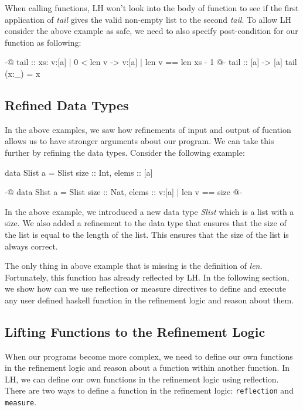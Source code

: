 \documentclass[]{rptuseminar}
\begin{document}
When calling functions, LH won't look into the body of function to see if the first application of \textit{tail} gives the valid non-empty list to the second \textit{tail}.
To allow LH consider the above example as safe, we need to also specify post-condition for our function as following:

\begin{haskell}
 {-@ tail :: xs: {v:[a] | 0 < len v} -> {v:[a] | len v == len xs - 1} @-}
 tail :: [a] -> [a]
 tail (x:_) = x
\end{haskell}
\subsection{Refined Data Types}
In the above examples, we saw how refinements of input and output of fucntion allows us to have stronger arguments about our program. 
We can take this further by refining the data types. Consider the following example:

\begin{haskell}
  data Slist a = Slist { size :: Int, elems :: [a] }

  {-@ data Slist a = Slist { size :: Nat, elems :: {v:[a] | len v == size} } @-}
\end{haskell}

In the above example, we introduced a new data type \textit{Slist} which is a list with a size. 
We also added a refinement to the data type that ensures that the size of the list is equal to the length of the list. 
This ensures that the size of the list is always correct.

The only thing in above example that is missing is the definition of \textit{len}. Fortunately, this function has already reflected by
LH. In the following section, we show how can we use reflection or measure directives to define and execute any user defined haskell function in the refinement logic and
reason about them.

\subsection{Lifting Functions to the Refinement Logic}
When our programs become more complex, we need to define our own functions in the refinement logic and reason about
a function within another function. In LH, we can define our own functions in the refinement logic using reflection.
There are two ways to define a function in the refinement logic: \texttt{reflection} and \texttt{measure}. 
\end{document}
